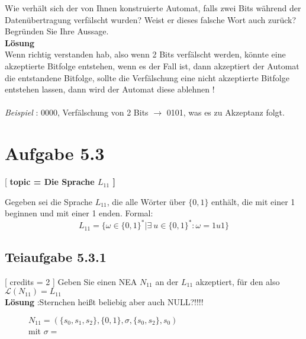 \documentclass[12pt]{article}
\begin{document}
 Wie verhält sich der von Ihnen konstruierte Automat, falls zwei Bits während der Datenübertragung 
 verfälscht wurden? Weist er dieses falsche Wort auch zurück? Begründen Sie Ihre Aussage. \\
  
  \textbf{Lösung}
 \\
 Wenn richtig verstanden hab, also wenn 2 Bits verfälscht werden, könnte eine akzeptierte Bitfolge entstehen, wenn es der Fall ist, dann akzeptiert der Automat die entstandene Bitfolge, sollte die Verfälschung eine nicht akzeptierte Bitfolge entstehen lassen, dann wird der Automat diese ablehnen !\\\\
 \textit{Beispiel} : 0000, Verfälschung von 2 Bits $\rightarrow$ 0101, was es zu Akzeptanz folgt.
 \section*{Aufgabe 5.3}[ 
\textbf{ topic = Die Sprache $L_{11}$ 
 ]} 
  
 Gegeben sei die Sprache $L_{11}$, die alle Wörter über $\{0, 1\}$ enthält, die mit einer 1 beginnen und mit einer 1 
 enden. Formal:  
 \[ 
 L_{11} = \{\omega \in \{0, 1\}^* | \exists \ u \in \{0, 1\}^* : \omega = 1u1 \} 
 \] 
  
 \subsection*{Teiaufgabe 5.3.1} [
 credits = 2 
 ] 
 Geben Sie einen NEA $N_{11}$ an der $L_{11}$ akzeptiert, für den also $\mathcal{L}(N_{11}) = L_{11}$ \\
 \textbf{Lösung} :Sternchen heißt beliebig aber auch NULL?!!!!\\ 
   
 \begin{figure}[h] 
   $N_{11} = (\{s_0,s_1,s_2\},\{0,1\},\sigma,\{s_0,s_2\},s_0)$ \\ mit $\sigma =$ \\

 \centering 
  
 \end{figure} 
  
\end{document}
